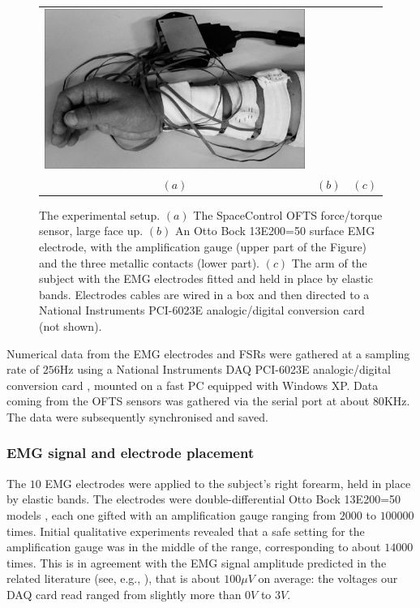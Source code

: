 \begin{figure}[!ht]
\begin{tabular}{ccc}
    \includegraphics[height=0.16\textheight]{figs/setup} \\
    $(a)$ & $(b)$ & $(c)$ \\
  \end{tabular}
  \caption{The experimental setup. $(a)$ The SpaceControl OFTS
    force/torque sensor, large face up. $(b)$ An Otto Bock 13E200=50
    surface EMG electrode, with the amplification gauge (upper part of
    the Figure) and the three metallic contacts (lower part). $(c)$
    The arm of the subject with the EMG electrodes fitted and held in
    place by elastic bands. Electrodes cables are wired in a box and
    then directed to a National Instruments PCI-6023E analogic/digital
    conversion card (not shown).}
  \label{fig:setup}
\end{figure}

Numerical data from the EMG electrodes and FSRs were gathered at a
sampling rate of $256$Hz using a National Instruments DAQ PCI-6023E
analogic/digital conversion card \cite{nidaq}, mounted on a fast PC
equipped with Windows XP. Data coming from the OFTS sensors was
gathered via the serial port at about $80$KHz. The data were
subsequently synchronised and saved.

\subsubsection{EMG signal and electrode placement}

The $10$ EMG electrodes were applied to the subject's right forearm,
held in place by elastic bands. The electrodes were
double-differential Otto Bock 13E200=50 models \cite{ottobock}, each
one gifted with an amplification gauge ranging from $2000$ to $100000$
times. Initial qualitative experiments revealed that a safe setting
for the amplification gauge was in the middle of the range,
corresponding to about $14000$ times. This is in agreement with the
EMG signal amplitude predicted in the related literature (see, e.g.,
\cite{deluca}), that is about $100 \mu V$ on average: the voltages our
DAQ card read ranged from slightly more than $0V$ to $3V$.


